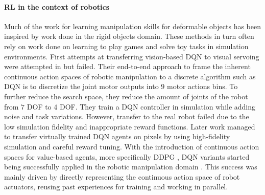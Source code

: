\documentclass[\home/main.tex]{subfiles}
\begin{document}
\paragraph{RL in the context of robotics}
Much of the work for learning manipulation skills for deformable objects has been inspired by work done in the rigid objects domain. These methods in turn often rely on work done on learning to play games and solve toy tasks in simulation environments.  First attempts at transferring vision-based DQN to visual servoing were attempted in \autocite{Zhang2015} but failed. Their end-to-end approach to frame the inherent continuous action spaces of robotic manipulation to a discrete algorithm such as DQN is to discretize the joint motor outputs into $9$ motor actions bins. To further reduce the search space, they reduce the amount of joints of the robot from $7$ DOF to $4$ DOF. They train a DQN controller in simulation while adding noise and task variations. However, transfer to the real robot failed due to the low simulation fidelity and inappropriate reward functions. Later work \autocite{James2016} managed to transfer virtually trained DQN agents on pixels by using high-fidelity simulation and careful reward tuning. With the introduction of continuous action spaces for value-based agents, more specifically DDPG \autocite{Lillicrap2015}, DQN variants started being successfully applied in the robotic manipulation domain \autocite{Gu2017}. This success was mainly driven by directly representing the continuous action space of robot actuators, reusing past experiences for training and working in parallel.
\end{document}
